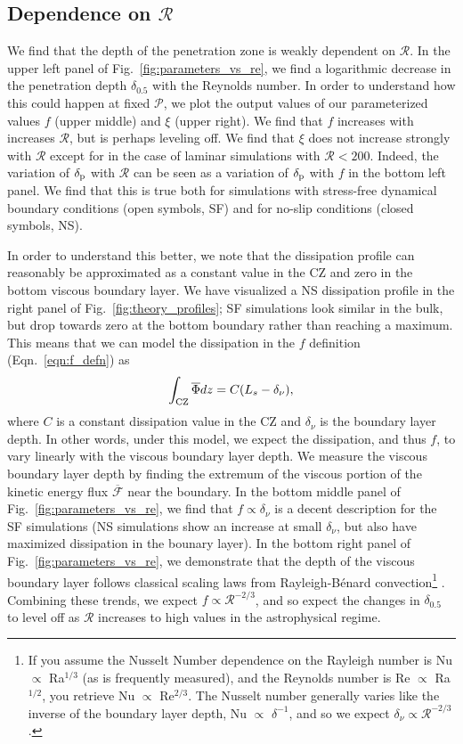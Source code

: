 \documentclass[twocolumn]{aastex631}
\newcommand{\delp}{\ensuremath{\delta_{\rm{p}}}}
\newcommand{\mP}{\ensuremath{\mathcal{P}}}
\newcommand{\mR}{\ensuremath{\mathcal{R}}}
\renewcommand{\bar}[1]{\overline{#1}}
\begin{document}
\subsection{Dependence on $\mR$}

We find that the depth of the penetration zone is weakly dependent on $\mR$.
In the upper left panel of Fig.~\ref{fig:parameters_vs_re}, we find a logarithmic decrease in the penetration depth $\delta_{0.5}$ with the Reynolds number.
In order to understand how this could happen at fixed $\mP$, we plot the output values of our parameterized values $f$ (upper middle) and $\xi$ (upper right).
We find that $f$ increases with increases $\mR$, but is perhaps leveling off.
We find that $\xi$ does not increase strongly with $\mR$ except for in the case of laminar simulations with $\mR < 200$.
Indeed, the variation of $\delp$ with $\mR$ can be seen as a variation of $\delp$ with $f$ in the bottom left panel.
We find that this is true both for simulations with stress-free dynamical boundary conditions (open symbols, SF) and for no-slip conditions (closed symbols, NS).

In order to understand this better, we note that the dissipation profile can reasonably be approximated as a constant value in the CZ and zero in the bottom viscous boundary layer.
We have visualized a NS dissipation profile in the right panel of Fig.~\ref{fig:theory_profiles}; SF simulations look similar in the bulk, but drop towards zero at the bottom boundary rather than reaching a maximum.
This means that we can model the dissipation in the $f$ definition (Eqn.~\ref{eqn:f_defn}) as
\begin{equation}
\int_{\rm{CZ}} \bar{\Phi} dz = C ( L_s - \delta_\nu ),
\end{equation}
where $C$ is a constant dissipation value in the CZ and $\delta_\nu$ is the boundary layer depth.
In other words, under this model, we expect the dissipation, and thus $f$, to vary linearly with the viscous boundary layer depth.
We measure the viscous boundary layer depth by finding the extremum of the viscous portion of the kinetic energy flux $\bar{\mathcal{F}}$ near the boundary.
In the bottom middle panel of Fig.~\ref{fig:parameters_vs_re}, we find that $f \propto \delta_\nu$ is a decent description for the SF simulations (NS simulations show an increase at small $\delta_\nu$, but also have maximized dissipation in the bounary layer).
In the bottom right panel of Fig.~\ref{fig:parameters_vs_re}, we demonstrate that the depth of the viscous boundary layer follows classical scaling laws from Rayleigh-B\'{e}nard convection\footnote{
If you assume the Nusselt Number dependence on the Rayleigh number is Nu $\propto$ Ra$^{1/3}$ (as is frequently measured), and the Reynolds number is Re $\propto$ Ra$^{1/2}$, you retrieve Nu $\propto$ Re$^{2/3}$. 
The Nusselt number generally varies like the inverse of the boundary layer depth, Nu $\propto$ $\delta^{-1}$, and so we expect $\delta_{\nu} \propto \mR^{-2/3}$.} \citep{ahlers_etal_2009, goluskin2016}.
Combining these trends, we expect $f \propto \mR^{-2/3}$, and so expect the changes in $\delta_{0.5}$ to level off as $\mR$ increases to high values in the astrophysical regime.
\end{document}
